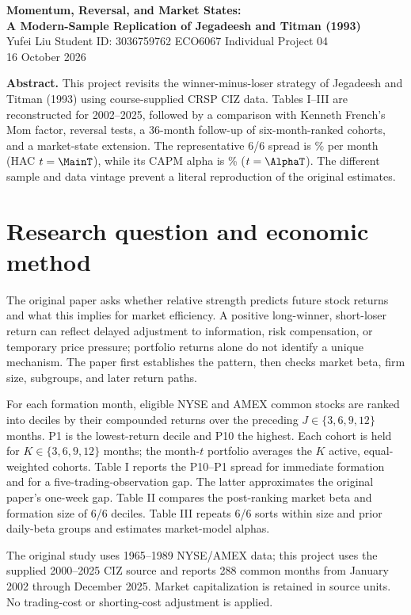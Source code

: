 \documentclass[10pt,a4paper]{article}
\begin{document}
\begin{center}
{\Large\bfseries Momentum, Reversal, and Market States:\\[3pt]
A Modern-Sample Replication of Jegadeesh and Titman (1993)}\\[8pt]
Yufei Liu \quad Student ID: 3036759762 \quad ECO6067 Individual Project 04\\[3pt]
16 October 2026
\end{center}
\noindent\textbf{Abstract.}
This project revisits the winner-minus-loser strategy of Jegadeesh and Titman (1993) using course-supplied CRSP CIZ data. Tables I--III are reconstructed for 2002--2025, followed by a comparison with Kenneth French's Mom factor, reversal tests, a 36-month follow-up of six-month-ranked cohorts, and a market-state extension. The representative 6/6 spread is \MainSpread\% per month (HAC $t=\MainT$), while its CAPM alpha is \MainAlpha\% ($t=\AlphaT$). The different sample and data vintage prevent a literal reproduction of the original estimates.

\section{Research question and economic method}
The original paper asks whether relative strength predicts future stock returns and what this implies for market efficiency. A positive long-winner, short-loser return can reflect delayed adjustment to information, risk compensation, or temporary price pressure; portfolio returns alone do not identify a unique mechanism. The paper first establishes the pattern, then checks market beta, firm size, subgroups, and later return paths.

For each formation month, eligible NYSE and AMEX common stocks are ranked into deciles by their compounded returns over the preceding $J\in\{3,6,9,12\}$ months. P1 is the lowest-return decile and P10 the highest. Each cohort is held for $K\in\{3,6,9,12\}$ months; the month-$t$ portfolio averages the $K$ active, equal-weighted cohorts. Table I reports the P10--P1 spread for immediate formation and for a five-trading-observation gap. The latter approximates the original paper's one-week gap. Table II compares the post-ranking market beta and formation size of 6/6 deciles. Table III repeats 6/6 sorts within size and prior daily-beta groups and estimates market-model alphas.

The original study uses 1965--1989 NYSE/AMEX data; this project uses the supplied 2000--2025 CIZ source and reports 288 common months from January 2002 through December 2025. Market capitalization is retained in source units. No trading-cost or shorting-cost adjustment is applied.
\end{document}
